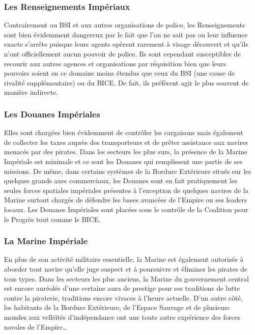 \documentclass[twoside]{article}
\begin{document}
\subsubsection{Les Renseignements Impériaux}
Contrairement au BSI et aux autres organisations de police, les Renseignements sont bien évidemment dangereux par le fait que l'on ne sait pas ou leur influence exacte s'arrête puisque leurs agents opèrent rarement à visage découvert et qu'ils n'ont officiellement aucun pouvoir de police. Ils sont cependant susceptibles de recourir aux autres agences et organisations par réquisition bien que leurs pouvoirs soient en ce domaine moins étendus que ceux du BSI (une cause de rivalité supplémentaire) ou du BICE. De fait, ils préfèrent agir le plus souvent de manière indirecte.  

\subsubsection{Les Douanes Impériales}
Elles sont chargées bien évidemment de contrôler les cargaisons mais également de collecter les taxes auprès des transporteurs et de prêter assistance aux navires menacés par des pirates. Dans les secteurs les plus surs, la présence de la Marine Impériale est minimale et ce sont les Douanes qui remplissent une partie de ses missions. De même, dans certains systèmes de la Bordure Extérieure situés sur les quelques grands axes commerciaux, les Douanes sont en fait pratiquement les seules forces spatiales impériales présentes à l'exception de quelques navires de la Marine surtout chargés de défendre les bases avancées de l'Empire ou ses leaders locaux. Les Douanes Impériales sont placées sous le contrôle de la Coalition pour le Progrès tout comme le BICE.

\subsubsection{La Marine Impériale}
En plus de son activité militaire essentielle, la Marine est également autorisée à aborder tout navire qu'elle juge suspect et à poursuivre et éliminer les pirates de tous types. Dans les secteurs les plus anciens, la Marine du gouvernement central est encore auréolée d'une certaine aura de prestige pour ses traditions de lutte contre la piraterie, traditions encore vivaces à l'heure actuelle. D'un autre côté, les habitants de la Bordure Extérieure, de l'Espace Sauvage et de plusieurs mondes aux velléités d'indépendance ont une toute autre expérience des forces navales de l'Empire\ldots
\end{document}
